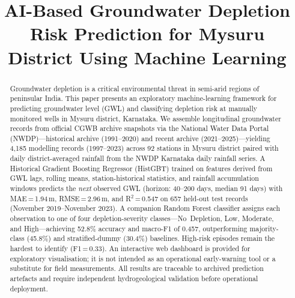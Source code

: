 \documentclass[conference]{IEEEtran}
\begin{document}
\title{AI-Based Groundwater Depletion Risk Prediction for Mysuru District
       Using Machine Learning}

\author{%
}

\maketitle

\begin{abstract}
Groundwater depletion is a critical environmental threat in
semi-arid regions of peninsular India. This paper presents an
exploratory machine-learning framework for predicting groundwater
level (GWL) and classifying depletion risk at manually monitored
wells in Mysuru district, Karnataka.
We assemble longitudinal groundwater records from official CGWB
archive snapshots via the National Water Data Portal (NWDP)---historical
archive (1991--2020) and recent archive (2021--2025)---yielding 4,185
modelling records (1997--2023) across 92 stations in Mysuru district
paired with daily district-averaged rainfall from the NWDP Karnataka
daily rainfall series.
A Historical Gradient Boosting Regressor (HistGBT) trained on
features derived from GWL lags, rolling means, station-historical
statistics, and rainfall accumulation windows predicts the
\emph{next} observed GWL
(horizon: 40--200 days, median 91 days) with
MAE\,=\,1.94\,m, RMSE\,=\,2.96\,m, and R$^2$\,=\,0.547 on
657 held-out test records (November 2019--November 2023).
A companion Random Forest classifier assigns each observation to one
of four depletion-severity classes---No~Depletion, Low, Moderate,
and High---achieving 52.8\% accuracy and macro-F1 of 0.457,
outperforming majority-class (45.8\%) and stratified-dummy (30.4\%)
baselines. High-risk episodes remain the hardest to identify
(F1\,=\,0.33). An interactive web dashboard is provided for
exploratory visualisation; it is not intended as an operational
early-warning tool or a substitute for field measurements.
All results are traceable to archived prediction artefacts and
require independent hydrogeological validation before
operational deployment.
\end{abstract}
\end{document}
